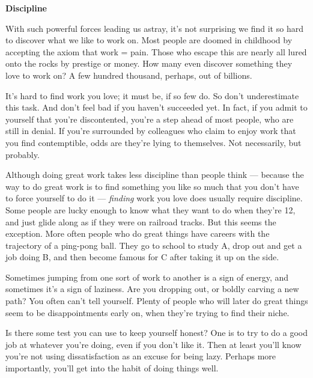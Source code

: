 \textbf{Discipline}

With such powerful forces leading us astray,
                    it's not surprising we find it so hard to discover what we
                    like to work on. Most people are doomed in childhood by
                    accepting the axiom that work = pain. Those who escape this
                    are nearly all lured onto the rocks by prestige or money.
                    How many even discover something they love to work on? A few
                    hundred thousand, perhaps, out of billions.

It's
                    hard to find work you love; it must be, if so few do. So
                    don't underestimate this task. And don't feel bad if you
                    haven't succeeded yet. In fact, if you admit to yourself
                    that you're discontented, you're a step ahead of most
                    people, who are still in denial. If you're surrounded by
                    colleagues who claim to enjoy work that you find
                    contemptible, odds are they're lying to themselves. Not
                    necessarily, but probably.

Although doing great
                    work takes less discipline than people think --- because
                    the way to do great work is to find something you like so
                    much that you don't have to force yourself to do it ---
                    \emph{finding} work you love does usually require
                    discipline. Some people are lucky enough to know what they
                    want to do when they're 12, and just glide along as if they
                    were on railroad tracks. But this seems the exception. More
                    often people who do great things have careers with the
                    trajectory of a ping-pong ball. They go to school to study
                    A, drop out and get a job doing B, and then become famous
                    for C after taking it up on the side.

Sometimes
                    jumping from one sort of work to another is a sign of
                    energy, and sometimes it's a sign of laziness. Are you
                    dropping out, or boldly carving a new path? You often can't
                    tell yourself. Plenty of people who will later do great
                    things seem to be disappointments early on, when they're
                    trying to find their niche.

Is there some test
                    you can use to keep yourself honest? One is to try to do a
                    good job at whatever you're doing, even if you don't like
                    it. Then at least you'll know you're not using
                    dissatisfaction as an excuse for being lazy. Perhaps more
                    importantly, you'll get into the habit of doing things
                    well.

